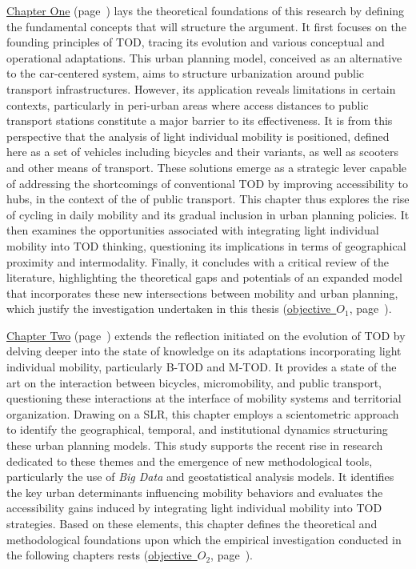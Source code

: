 \begin{refsegment}
\hyperref[chap1:titre]{Chapter One} (page~\pageref{chap1:titre}) lays the theoretical foundations of this research by defining the fundamental concepts that will structure the argument. It first focuses on the founding principles of \acrshort{TOD}, tracing its evolution and various conceptual and operational adaptations. This urban planning model, conceived as an alternative to the car-centered system, aims to structure urbanization around public transport infrastructures. However, its application reveals limitations in certain contexts, particularly in peri-urban areas where access distances to public transport stations constitute a major barrier to its effectiveness. It is from this perspective that the analysis of light individual mobility is positioned, defined here as a set of vehicles including bicycles and their variants, as well as scooters and other means of transport. These solutions emerge as a strategic lever capable of addressing the shortcomings of conventional \acrshort{TOD} by improving accessibility to hubs, in the context of the  of public transport. This chapter thus explores the rise of cycling in daily mobility and its gradual inclusion in urban planning policies. It then examines the opportunities associated with integrating light individual mobility into \acrshort{TOD} thinking, questioning its implications in terms of geographical proximity and intermodality. Finally, it concludes with a critical review of the literature, highlighting the theoretical gaps and potentials of an expanded model that incorporates these new intersections between mobility and urban planning, which justify the investigation undertaken in this thesis (\hyperref[objectif-1]{objective~\(O_1\)}, page~\pageref{objectif-1}).%

\hyperref[chap2:titre]{Chapter Two} (page~\pageref{chap2:titre}) extends the reflection initiated on the evolution of \acrshort{TOD} by delving deeper into the state of knowledge on its adaptations incorporating light individual mobility, particularly \acrshort{B-TOD} and \acrshort{M-TOD}. It provides a state of the art on the interaction between bicycles, micromobility, and public transport, questioning these interactions at the interface of mobility systems and territorial organization. Drawing on a \acrfull{SLR}, this chapter employs a scientometric approach to identify the geographical, temporal, and institutional dynamics structuring these urban planning models. This study supports the recent rise in research dedicated to these themes and the emergence of new methodological tools, particularly the use of \textsl{Big Data} and geostatistical analysis models. It identifies the key urban determinants influencing mobility behaviors and evaluates the accessibility gains induced by integrating light individual mobility into \acrshort{TOD} strategies. Based on these elements, this chapter defines the theoretical and methodological foundations upon which the empirical investigation conducted in the following chapters rests (\hyperref[objectif-2]{objective~\(O_2\)}, page~\pageref{objectif-2}).%


\end{refsegment}
